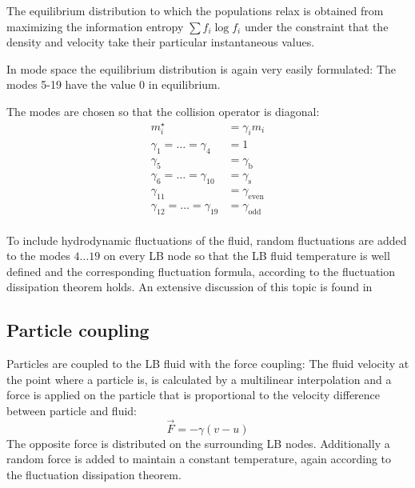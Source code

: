 The equilibrium distribution to which the populations relax 
is obtained from maximizing the information entropy 
$\sum f_i \log f_i$ under the constraint that the density
and velocity take their particular instantaneous 
values. 


In mode space the equilibrium distribution is again very 
easily formulated: The modes 5-19 have the value 0 in equilibrium.

The modes are chosen so that the collision operator is diagonal:
\begin{align*}
  m^\star_i &= \gamma_i m_i  \\
  \gamma_1=\dots=\gamma_4&=1 \\
  \gamma_5&=\gamma_\text{b} \\
  \gamma_6=\dots=\gamma_{10}&=\gamma_\text{s} \\
  \gamma_{11}&=\gamma_\text{even} \\
  \gamma_{12}=\dots = \gamma_{19}&=\gamma_\text{odd} \\
\end{align*}

To include hydrodynamic fluctuations of the fluid, 
random fluctuations are added to the modes $4\dots 19$ on every LB node so that
the LB fluid temperature is well defined and the corresponding
fluctuation formula, according to the fluctuation dissipation theorem holds.
An extensive discussion of this topic is found in \cite{duenweg07a}

\subsection*{Particle coupling}

Particles are coupled to the LB fluid with the force coupling:
The fluid velocity at the point where a particle is, is calculated 
by a multilinear interpolation and a force is applied on the particle
that is proportional to the velocity difference between particle 
and fluid:
\begin{equation}
  \vec{F} = - \gamma \left(v-u\right) 
\end{equation}
The opposite force is distributed on the surrounding LB nodes. Additionally
a random force is added to maintain a constant temperature, again according
to the fluctuation dissipation theorem.


